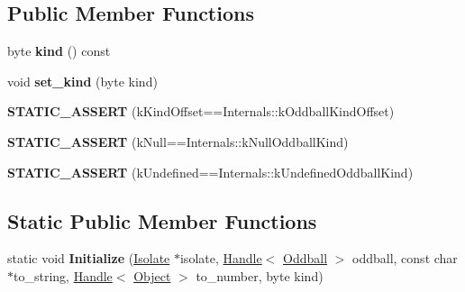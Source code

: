 \subsection*{Public Member Functions}
\begin{DoxyCompactItemize}
\item 
\hypertarget{classv8_1_1internal_1_1_oddball_a4e4dcda0283ac0d7c5075ac66a450c13}{}byte {\bfseries kind} () const \label{classv8_1_1internal_1_1_oddball_a4e4dcda0283ac0d7c5075ac66a450c13}

\item 
\hypertarget{classv8_1_1internal_1_1_oddball_a23ac73dee2b9eccc79fad51864a92061}{}void {\bfseries set\+\_\+kind} (byte kind)\label{classv8_1_1internal_1_1_oddball_a23ac73dee2b9eccc79fad51864a92061}

\item 
\hypertarget{classv8_1_1internal_1_1_oddball_adaa90c45078014efb0017364c9fc7505}{}{\bfseries S\+T\+A\+T\+I\+C\+\_\+\+A\+S\+S\+E\+R\+T} (k\+Kind\+Offset==Internals\+::k\+Oddball\+Kind\+Offset)\label{classv8_1_1internal_1_1_oddball_adaa90c45078014efb0017364c9fc7505}

\item 
\hypertarget{classv8_1_1internal_1_1_oddball_a8b098918d70d60336f7cb6686df4cee3}{}{\bfseries S\+T\+A\+T\+I\+C\+\_\+\+A\+S\+S\+E\+R\+T} (k\+Null==Internals\+::k\+Null\+Oddball\+Kind)\label{classv8_1_1internal_1_1_oddball_a8b098918d70d60336f7cb6686df4cee3}

\item 
\hypertarget{classv8_1_1internal_1_1_oddball_ac59ae66d1803a5c087b45515d9358891}{}{\bfseries S\+T\+A\+T\+I\+C\+\_\+\+A\+S\+S\+E\+R\+T} (k\+Undefined==Internals\+::k\+Undefined\+Oddball\+Kind)\label{classv8_1_1internal_1_1_oddball_ac59ae66d1803a5c087b45515d9358891}

\end{DoxyCompactItemize}
\subsection*{Static Public Member Functions}
\begin{DoxyCompactItemize}
\item 
\hypertarget{classv8_1_1internal_1_1_oddball_a2c8baf154774caefe968bf9cb5bc7499}{}static void {\bfseries Initialize} (\hyperlink{classv8_1_1internal_1_1_isolate}{Isolate} $\ast$isolate, \hyperlink{classv8_1_1internal_1_1_handle}{Handle}$<$ \hyperlink{classv8_1_1internal_1_1_oddball}{Oddball} $>$ oddball, const char $\ast$to\+\_\+string, \hyperlink{classv8_1_1internal_1_1_handle}{Handle}$<$ \hyperlink{classv8_1_1internal_1_1_object}{Object} $>$ to\+\_\+number, byte kind)\label{classv8_1_1internal_1_1_oddball_a2c8baf154774caefe968bf9cb5bc7499}

\end{DoxyCompactItemize}

